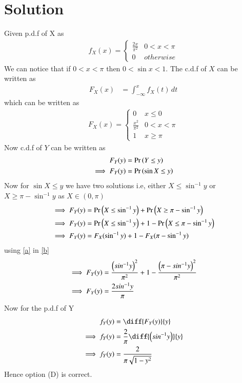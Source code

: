 \documentclass[journal,12pt,twocolumn]{IEEEtran}
\begin{document}
\section*{Solution}
Given p.d.f of X as
\begin{align}
    f_{X}(x)=\begin{cases} 
            \frac{2x}{\pi^2}  &  0<x<\pi\\
            0 & otherwise
            \end{cases} 
\end{align}
We can notice that if $0< x< \pi$ then $0< \sin{x}< 1$.
The c.d.f of $X$ can be written as
\begin{align}
    F_X(x) &= \int_{-\infty}^{x}f_X(t)\,dt
\end{align}
which can be written as
\begin{align}
    F_{X}(x)=\begin{cases} 
            0 & x\le 0\\
            \frac{x^2}{\pi^2}  &  0<x<\pi\\
            1 & x\ge \pi
            \end{cases}
            \label{a}
\end{align}
Now c.d.f of $Y$ can be written as 
\begin{align}
    F_Y(y) &= \Pr\left(Y\leq y\right)\\
    \implies F_Y(y) &= \Pr\left(\sin{X}\leq y\right)
\end{align}
Now for $\sin{X}\leq y$ we have two solutions i.e, either $X\leq\sin^{-1}{y}$ or $X\geq \pi-\sin^{-1}{y}$ as $X\in(0,\pi)$
\begin{align}
    \implies F_Y(y) &= \Pr\left(X\leq \sin^{-1}{y}\right)+\Pr\left(X\geq \pi-\sin^{-1}{y}\right)\\
    \implies F_Y(y) &= \Pr\left(X\leq \sin^{-1}{y}\right)+1-\Pr\left(X\leq \pi-\sin^{-1}{y}\right)\\
    \implies F_Y(y) &= F_X(\sin^{-1}{y})+1-F_X(\pi-\sin^{-1}{y})
    \label{b}
\end{align}
using \eqref{a} in \eqref{b}
\begin{align}
    \implies F_Y(y) &= \frac{\left(sin^{-1}{y}\right)^2}{\pi^2}+1-\frac{\left(\pi-sin^{-1}{y}\right)^2}{\pi^2}\\
    \implies F_Y(y) &= \frac{2sin^{-1}{y}}{\pi}
\end{align}
Now for the p.d.f of Y
\begin{align}
    f_Y(y) &= \diff{F_Y(y)}{y}\\
    \implies f_Y(y) &= \frac{2}{\pi}\diff{\brak{sin^{-1}{y}}}{y}\\
    \implies f_Y(y) &= \frac{2}{\pi\sqrt{1-y^2}}
\end{align}
Hence option (D) is correct.
\end{document}
